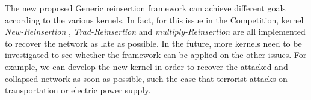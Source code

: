 \documentclass{article}
\begin{document}
	
	The new proposed Generic reinsertion framework can achieve different goals according to the various kernels. In fact, for this issue in the Competition, kernel \textit{New-Reinsertion} , \textit{Trad-Reinsertion} and \textit{multiply-Reinsertion} are all implemented to recover the network as late as possible. In the future, more kernels need to be investigated to see whether the framework can be applied on the other issues. For example, we can develop the new kernel in order to recover the attacked and collapsed network as soon as possible, such the case that terrorist attacks on transportation or electric power supply. 
	


	
	
	
	
	
	
	
	
\end{document}
